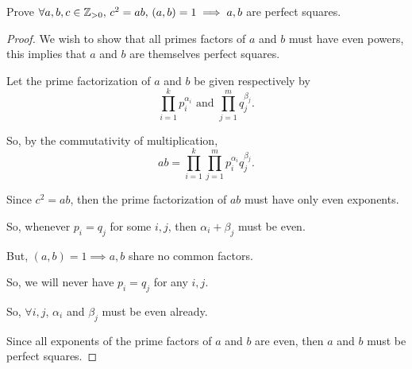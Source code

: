 \documentclass[../hw1]{subfiles}
\begin{document}
\begin{problem}[7]
Prove $\forall a,b,c \in \mathbb{Z}_{>0},\, c^2=ab,\, (a,b)=1 \implies a,b$ are perfect squares.
\end{problem}
\begin{proof}
	We wish to show that all primes factors of $a$ and $b$ must have even powers, this implies that  $a$ and  $b$ are themselves perfect squares.

	Let the prime factorization of  $a$ and  $b$ be given respectively by  \[
		\prod_{i=1}^{k}p_i^{\alpha_i}\text{ and } \prod_{j=1}^{m}q_j^{\beta_j}
		.\]

	So, by the commutativity of multiplication, \[
		ab =  \prod_{i=1}^{k}\prod_{j=1}^{m}p_i^{\alpha_i}q_j^{\beta_j}
		.\]

	Since $c^2=ab$, then the prime factorization of $ab$ must have only even exponents.

	So, whenever  $p_i = q_j$ for some  $i,j$, then  $\alpha_i+\beta_j$ must be even.

	But,  $(a,b)=1\implies a,b$ share no common factors.

	So, we will never have $p_i = q_j$ for any $i,j$.

	So, $\forall i,j$, $\alpha_i$ and $\beta_j$ must be even already.

	Since all exponents of the prime factors of  $a$ and  $b$ are even, then  $a$ and $b$ must be perfect squares.
\end{proof}
\end{document}

